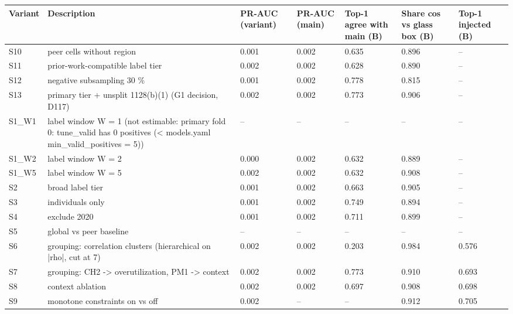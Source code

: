 \begin{tabular}{lllllll}
\hline
Variant & Description & PR-AUC (variant) & PR-AUC (main) & Top-1 agree with main (B) & Share cos vs glass box (B) & Top-1 injected (B) \\
\hline
S10 & peer cells without region & 0.001 & 0.002 & 0.635 & 0.896 & -- \\
S11 & prior-work-compatible label tier & 0.002 & 0.002 & 0.628 & 0.890 & -- \\
S12 & negative subsampling 30 \% & 0.001 & 0.002 & 0.778 & 0.815 & -- \\
S13 & primary tier + unsplit 1128(b)(1) (G1 decision, D117) & 0.002 & 0.002 & 0.773 & 0.906 & -- \\
S1\_W1 & label window W = 1 (not estimable: primary fold 0: tune\_valid has 0 positives (< models.yaml min\_valid\_positives = 5)) & -- & -- & -- & -- & -- \\
S1\_W2 & label window W = 2 & 0.000 & 0.002 & 0.632 & 0.889 & -- \\
S1\_W5 & label window W = 5 & 0.002 & 0.002 & 0.632 & 0.908 & -- \\
S2 & broad label tier & 0.001 & 0.002 & 0.663 & 0.905 & -- \\
S3 & individuals only & 0.001 & 0.002 & 0.749 & 0.894 & -- \\
S4 & exclude 2020 & 0.001 & 0.002 & 0.711 & 0.899 & -- \\
S5 & global vs peer baseline & -- & -- & -- & -- & -- \\
S6 & grouping: correlation clusters (hierarchical on |rho|, cut at 7) & 0.002 & 0.002 & 0.203 & 0.984 & 0.576 \\
S7 & grouping: CH2 -> overutilization, PM1 -> context & 0.002 & 0.002 & 0.773 & 0.910 & 0.693 \\
S8 & context ablation & 0.002 & 0.002 & 0.697 & 0.908 & 0.698 \\
S9 & monotone constraints on vs off & 0.002 & -- & -- & 0.912 & 0.705 \\
\hline
\end{tabular}
